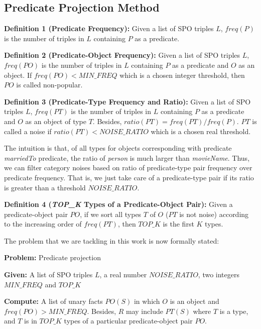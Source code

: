 \documentclass{acm_proc_article-sp}
\begin{document}
\subsection{Predicate Projection Method\\}

\textbf{Definition 1 (Predicate Frequency):} Given a list of SPO triples $L$, $freq(P)$ is the number of triples in $L$ containing $P$ as a predicate.

\textbf{Definition 2 (Predicate-Object Frequency):} Given a list of SPO triples $L$, $freq(PO)$ is the number of triples in $L$ containing $P$ as a predicate and $O$ as an object. If $freq(PO) < MIN\_FREQ$ which is a chosen integer threshold, then $PO$ is called non-popular.

\textbf{Definition 3 (Predicate-Type Frequency and Ratio):} Given a list of SPO triples $L$, $freq(PT)$ is the number of triples in $L$ containing $P$ as a predicate and $O$ as an object of type $T$. Besides, $ratio(PT) = freq(PT) / freq(P)$. $PT$ is called a noise if $ratio(PT) < NOISE\_RATIO$ which is a chosen real threshold.

The intuition is that, of all types for objects corresponding with predicate \textit{marriedTo} predicate, the ratio of \textit{person} is much larger than \textit{movieName}. Thus, we can filter category noises based on ratio of predicate-type pair frequency over predicate frequency. That is, we just take care of a predicate-type pair if its ratio is greater than a threshold $NOISE\_RATIO$.



\textbf{Definition 4 (\textit{TOP\_K} Types of a Predicate-Object Pair):} Given a predicate-object pair $PO$, if we sort all types $T$ of $O$ ($PT$ is not noise) according to the increasing order of $freq(PT)$, then $TOP\_K$ is the first $K$ types.

The problem that we are tackling in this work is now formally stated:

\begin{framed}
\textbf{Problem:} Predicate projection

\textbf{Given:} A list of SPO triples $L$, a real number $NOISE\_RATIO$, two integers $MIN\_FREQ$ and $TOP\_K$

\textbf{Compute:} A list of unary facts $PO(S)$ in which $O$ is an object and $freq(PO) > MIN\_FREQ$. Besides, $R$ may include $PT(S)$ where $T$ is a type, and $T$ is in $TOP\_K$ types of a particular predicate-object pair $PO$.
\end{framed}
\end{document}
